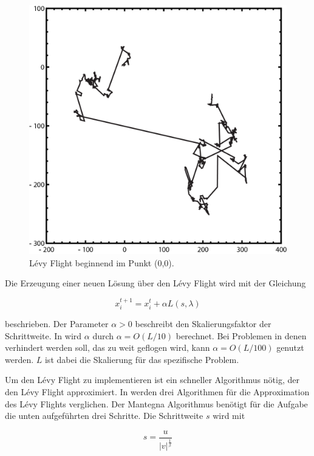 \documentclass[conference]{IEEEtran}
\begin{document}
      \begin{figure}
        \centering
        \includegraphics[width=0.8\linewidth]{LevyFlight.png}
        \caption{Lévy Flight beginnend im Punkt (0,0).}
        \label{fig:levyFlight}
      \end{figure}


      Die Erzeugung einer neuen Lösung über den Lévy Flight wird mit der Gleichung

      \begin{equation}
      x_{i}^{t+1} = x_{i}^{t} + \alpha L(s, \lambda)\label{eq}
      \end{equation}

      beschrieben. Der Parameter $\alpha > 0$ beschreibt den Skalierungsfaktor der Schrittweite.  
      In \cite{b7} wird $\alpha$ durch $\alpha = O(L/10)$ berechnet. Bei Problemen in denen verhindert 
      werden soll, das zu weit geflogen wird, kann $\alpha = O(L/100)$ genutzt werden. $L$ ist dabei die 
      Skalierung für das spezifische Problem.

      Um den Lévy Flight zu implementieren ist ein schneller Algorithmus nötig, der den Lévy Flight approximiert. 
      In \cite{b8} werden drei Algorithmen für die Approximation des Lévy Flights verglichen. Der 
      Mantegna Algorithmus benötigt für die Aufgabe die unten aufgeführten drei Schritte. Die Schrittweite $s$ wird mit
      
      \begin{equation}
        s = \frac{u}{|v|^{\frac{1}{\beta}}}\label{eq}
      \end{equation}
\end{document}

